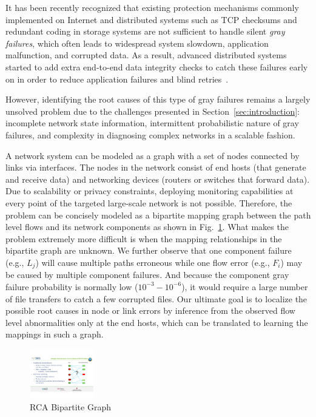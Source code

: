 It has been recently recognized that existing protection mechanisms commonly implemented on Internet and distributed systems such as TCP checksums and redundant coding in storage systems are not sufficient to handle silent {\it gray failures}, which often leads to widespread system slowdown, application malfunction, and corrupted data. As a result, advanced distributed systems started to add extra end-to-end data integrity checks to catch these failures early on in order to reduce application failures and blind retries~\cite{swip:pearc:2019}. 

However, identifying the root causes of this type of gray failures remains a largely unsolved problem due to the challenges presented in Section~\ref{sec:introduction}: 
incomplete network state information, intermittent probabilistic nature of gray failures, and complexity in diagnosing complex networks in a scalable fashion.  

A network system can be modeled as a graph with a set of nodes connected by links via interfaces. The nodes in the network consist of end hosts (that generate and receive data) and networking devices (routers or switches that forward data). Due to scalability or privacy constraints, deploying monitoring capabilities at every point of the targeted large-scale network is not possible. Therefore, the problem can be concisely modeled as a bipartite mapping graph between the path level flows and its network components as shown in Fig.~\ref{fig:bipartite}. What makes the problem extremely more difficult is when the mapping relationships in the bipartite graph are unknown. We further observe that one component failure (e.g., $L_j$) will cause multiple paths erroneous while one flow error (e.g., $F_i$) may be caused by multiple component failures. And because the component gray failure probability is normally low ($10^{-3} - 10^{-6}$), it would require a large number of file transfers to catch a few corrupted files. Our ultimate goal is to localize the possible root causes in node or link errors by inference from the observed flow level abnormalities only at the end hosts, which can be translated to learning the mappings in such a graph.

\begin{figure}
  \begin{center}
    \includegraphics[width=0.25\textwidth]{./figure/RCABipartite}
  \end{center}
  \vspace{-5pt}
\caption{RCA Bipartite Graph}
\vspace{-5pt}
\label{fig:bipartite}
\end{figure}

